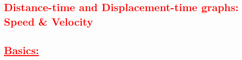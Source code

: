 \documentclass[A4,12pt]{article}
\begin{document}
\begin{enumerate}[label=\bfseries (\arabic*)]




























\section*{\textcolor{red}{Distance-time and Displacement-time graphs: Speed \& Velocity}}

%
%


\subsection*{\textcolor{red}{\underline{Basics:}}}





\end{enumerate}
\end{document}
